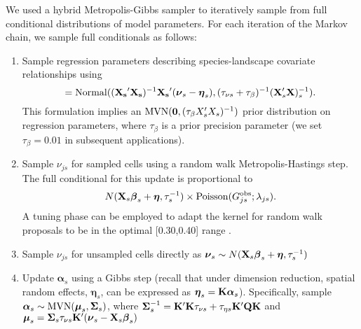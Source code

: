 \documentclass[12pt,fleqn]{article}
\begin{document}
\begin{flushleft}
\hspace{.5in} We used a hybrid Metropolis-Gibbs sampler \citep[cf.][]{GelmanEtAl2004} to iteratively sample from full conditional distributions
of model parameters.  For each iteration of the Markov chain, we sample full conditionals as follows:

\begin{enumerate}
  \item Sample regression parameters describing species-landscape covariate relationships using
  \begin{equation*}
  [\boldsymbol{\beta}_s|\hdots]={\rm Normal}(({\bf X_s}^\prime {\bf X_s})^{-1}{\bf X_s}^\prime (\boldsymbol{\nu}_s-\boldsymbol{\eta}_s),(\tau_{\nu s}+\tau_\beta)^{-1}({\bf X}_s^\prime {\bf X})_s^{-1}).
  \end{equation*}
  This formulation implies an ${\rm MVN}({\bf 0},(\tau_\beta X_s^\prime X_s)^{-1})$ prior distribution
  on regression parameters, where $\tau_\beta$ is a prior precision parameter (we set $\tau_\beta=0.01$ in subsequent applications). \\

  \item Sample $\nu_{js}$ for sampled cells using a random walk Metropolis-Hastings step.  The full conditional
  for this update is proportional to
  \begin{equation*}
  N({\bf X}_s \boldsymbol{\beta}_s + \boldsymbol{\eta},\tau_s^{-1})\times
    {\rm Poisson}(G_{js}^{\rm obs};\lambda_{js}).
  \end{equation*}
  A tuning phase can be employed to adapt the kernel for random walk proposals to be in the optimal [0.30,0.40] range \citep{GelmanEtAl2004}.
  \\

  \item Sample $\nu_{js}$ for unsampled cells directly as
    $\boldsymbol{\nu}_{s} \sim N({\bf X}_s \boldsymbol{\beta}_s + \boldsymbol{\eta},\tau_s^{-1})$ \\

  \item Update $\boldsymbol{\alpha}_s$ using a Gibbs step (recall that under dimension reduction, spatial random effects, $\boldsymbol{\eta}_s$, can be expressed as $\boldsymbol{\eta}_s={\bf K}\boldsymbol{\alpha}_s$).  Specifically, sample $\boldsymbol{\alpha}_s \sim {\rm MVN}(\boldsymbol{\mu}_s,\boldsymbol{\Sigma}_s)$, where $\boldsymbol{\Sigma}_s^{-1}={\bf K}^\prime {\bf K}\tau_{\nu s}+\tau_{\eta s}{\bf K}^\prime {\bf Q} {\bf K}$ and $\boldsymbol{\mu}_s=\boldsymbol{\Sigma}_s \tau_{\nu s} {\bf K}^\prime (\boldsymbol{\nu}_s - {\bf X}_s \boldsymbol{\beta}_s) $ \\


\end{enumerate}
\end{flushleft}
\end{document}
